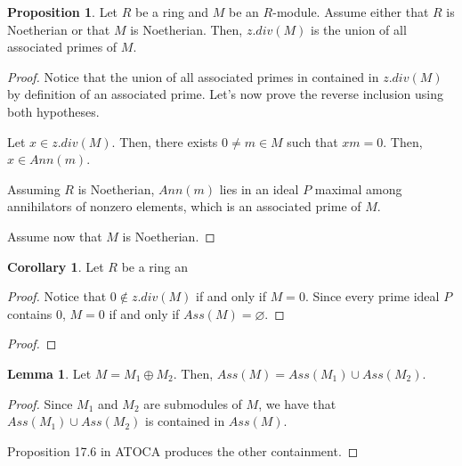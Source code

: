 \documentclass{article}
\theoremstyle{definition}
\newtheorem{lemma}[theorem]{Lemma}
\newtheorem{proposition}[theorem]{Proposition}
\newtheorem{corollary}{Corollary}[theorem]
\begin{document}


\begin{proposition}
    Let $ R $ be a ring and $ M $ be an $ R $-module.
    Assume either that $ R $ is Noetherian or that $ M $ is Noetherian.
    Then, $ z.div(M) $ is the union of all associated primes of $ M $.
\end{proposition}
\begin{proof}
    Notice that the union of all associated primes in contained in $ z.div(M) $
    by definition of an associated prime. Let's now prove the reverse
    inclusion using both hypotheses.

    Let $ x \in z.div(M) $. Then, there exists $ 0 \neq m \in M $
    such that $ xm = 0 $. Then, $ x \in Ann(m) $.

    Assuming $ R $ is Noetherian, $ Ann(m) $ lies in an ideal $ P $
    maximal among annihilators of nonzero elements, which is an associated
    prime of $ M $.

    Assume now that $ M $ is Noetherian.

\end{proof}

\begin{corollary}
    Let $ R $ be a ring an
\end{corollary}
\begin{proof}
    Notice that $ 0 \notin z.div(M) $ if and only if $ M = 0 $.
    Since every prime ideal $ P $ contains $ 0 $, $ M = 0 $
    if and only if $ Ass(M) = \varnothing $.
\end{proof}
\begin{proof}
    
\end{proof}

\begin{lemma}
    Let $ M = M_{1} \oplus M_{2} $.
    Then, $ Ass(M) = Ass(M_{1}) \cup Ass(M_{2}) $.
\end{lemma}
\begin{proof}
    Since $ M_{1} $ and $ M_{2} $ are submodules of $ M $,
    we have that $ Ass(M_{1}) \cup Ass(M_{2}) $ is contained in $ Ass(M) $.

    Proposition 17.6 in ATOCA produces the other containment.
\end{proof}
\end{document}
